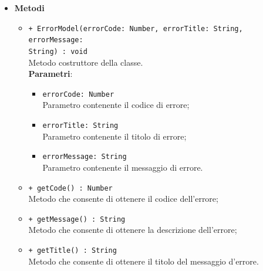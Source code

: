 \begin{itemize}
			\item \textbf{Metodi}
			\begin{itemize}
				\item \texttt{+ ErrorModel(errorCode: Number, errorTitle: String, errorMessage:\\ String) : void} \\
				Metodo costruttore della classe.\\
				\textbf{Parametri}: 
				\begin{itemize}
					\item \texttt{errorCode: Number} \\
					Parametro contenente il codice di errore;
					\item \texttt{errorTitle: String} \\
					Parametro contenente il titolo di errore;
					\item \texttt{errorMessage: String} \\
					Parametro contenente il messaggio di errore.
				\end{itemize}
				\item \texttt{+ getCode() : Number} \\
				Metodo che consente di ottenere il codice dell'errore;
				\item \texttt{+ getMessage() : String} \\
				Metodo che consente di ottenere la descrizione dell'errore;
				\item \texttt{+ getTitle() : String} \\
				Metodo che consente di ottenere il titolo del messaggio d'errore. 
			\end{itemize}
		\end{itemize}
			
		